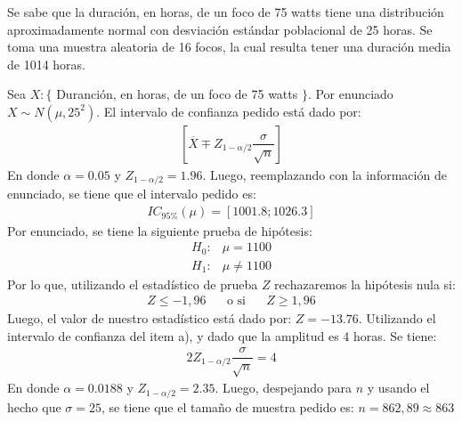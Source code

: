\addpoints
\question[30] Se sabe que la duraci\'on, en horas, de un foco de 75 watts tiene una distribuci\'on aproximadamente normal con desviaci\'on est\'andar poblacional de 25 horas. Se toma una muestra aleatoria de 16 focos, la cual resulta tener una duraci\'on media de 1014 horas. \noaddpoints {}

\begin{solution}
Sea $X: \{$ Duranci\'on, en horas, de un foco de 75 watts  $\}$. Por enunciado $X \sim N(\mu,25^2)$. El intervalo de confianza pedido est\'a dado por:\begin{align*}\left[ \overline{X} \mp Z_{1-\alpha /2}\dfrac{\sigma}{\sqrt{n}} \right] \end{align*}En donde $\alpha=0.05$ y $Z_{1-\alpha /2}=1.96$. Luego, reemplazando con la informaci\'on de enunciado, se tiene que el intervalo pedido es: \begin{align*}IC_{95\%}(\mu)=\left[1001.8;1026.3\right]\end{align*} Por enunciado, se tiene la siguiente prueba de hip\'otesis: \begin{align*}H_0:& \mu = 1100 \\H_1:& \mu \neq 1100\end{align*}Por lo que, utilizando el estad\'istico de prueba $Z$ rechazaremos la hip\'otesis nula si: \begin{align*}Z\leq -1,96 \hspace{20pt} \text{o si} \hspace{20pt}  Z\geq 1,96\end{align*} Luego, el valor de nuestro estad\'istico est\'a dado por: $Z=-13.76$. Utilizando el intervalo de confianza del item a), y dado que la amplitud es 4 horas. Se tiene: \begin{align*}2Z_{1-\alpha /2}\dfrac{\sigma}{\sqrt{n}}=4 \end{align*} En donde $\alpha=0.0188$ y $Z_{1-\alpha /2}=2.35$. Luego, despejando para $n$ y usando el hecho que $\sigma=25$, se tiene que el tama\~no de muestra pedido es: $n=862,89 \approx 863$ 
\end{solution}

